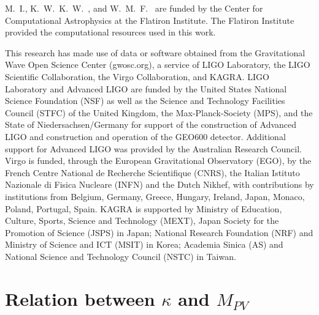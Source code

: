 \documentclass[aps,prd,twocolumn,superscriptaddress,preprintnumbers,floatfix,nofootinbib]{revtex4-2}
\begin{document}
\begin{acknowledgments}
M.~I., K.~W.~K.~W.~, and W.~M.~F.~ are funded by the Center for Computational Astrophysics at the Flatiron Institute.
The Flatiron Institute provided the computational resources used in this work.

This research has made use of data or software obtained from the Gravitational Wave Open Science Center (gwosc.org), a service of LIGO Laboratory, the LIGO Scientific Collaboration, the Virgo Collaboration, and KAGRA.
LIGO Laboratory and Advanced LIGO are funded by the United States National Science Foundation (NSF) as well as the Science and Technology Facilities Council (STFC) of the United Kingdom, the Max-Planck-Society (MPS), and the State of Niedersachsen/Germany for support of the construction of Advanced LIGO and construction and operation of the GEO600 detector.
Additional support for Advanced LIGO was provided by the Australian Research Council.
Virgo is funded, through the European Gravitational Observatory (EGO), by the French Centre National de Recherche Scientifique (CNRS), the Italian Istituto Nazionale di Fisica Nucleare (INFN) and the Dutch Nikhef, with contributions by institutions from Belgium, Germany, Greece, Hungary, Ireland, Japan, Monaco, Poland, Portugal, Spain.
KAGRA is supported by Ministry of Education, Culture, Sports, Science and Technology (MEXT), Japan Society for the Promotion of Science (JSPS) in Japan; National Research Foundation (NRF) and Ministry of Science and ICT (MSIT) in Korea; Academia Sinica (AS) and National Science and Technology Council (NSTC) in Taiwan.
\end{acknowledgments}

\appendix

\section{Relation between $\kappa$ and $M_{PV}$}
\label{sec:M_PV_derivation}
\end{document}
